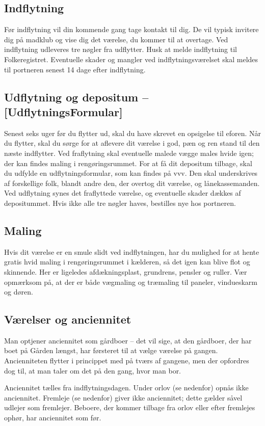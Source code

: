 \documentclass[11pt,article,twoside,openany,danish,extrafontsizes]{memoir} %
\begin{document}
\subsection{Indflytning}
Før indflytning vil din kommende gang tage kontakt til dig. De vil typisk invitere dig på madklub og vise dig det værelse, du kommer til at overtage. Ved indflytning udleveres tre nøgler fra udflytter. Husk at melde indflytning til Folkeregistret. Eventuelle skader og mangler ved indflytningsværelset skal meldes til portneren senest 14 dage efter indflytning.

\subsection{Udflytning og depositum -- [UdflytningsFormular]}
Senest seks uger før du flytter ud, skal du have skrevet en opsigelse til eforen. Når du flytter, skal du sørge for at aflevere dit værelse i god, pæn og ren stand til den næste indflytter. Ved fraflytning skal eventuelle malede vægge males hvide igen; der kan findes maling i rengøringsrummet. For at få dit depositum tilbage, skal du udfylde en udflytningsformular, som kan findes på vvv. Den skal underskrives af forskellige folk, blandt andre den, der overtog dit værelse, og lånekassemanden. Ved udflytning synes det fraflyttede værelse, og eventuelle skader dækkes af depositummet. Hvis ikke alle tre nøgler haves, bestilles nye hos portneren.


\subsection{Maling}
Hvis dit værelse er en smule slidt ved indflytningen, har du mulighed for at hente gratis hvid maling i rengøringsrummet i kælderen, så det igen kan blive flot og skinnende. Her er ligeledes afdækningsplast, grundrens, pensler og ruller. Vær opmærksom på, at der er både vægmaling og træmaling til paneler, vindueskarm og døren.

\subsection{Værelser og anciennitet}
Man optjener anciennitet som gårdboer -- det vil sige, at den gårdboer, der har boet på Gården længst, har førsteret til at vælge værelse på gangen. Ancienniteten flytter i princippet med på tværs af gangene, men der opfordres dog til, at man taler om det på den gang, hvor man bor.

Anciennitet tælles fra indflytningsdagen. Under orlov (se nedenfor) opnås ikke anciennitet. Fremleje (se nedenfor) giver ikke anciennitet; dette gælder såvel udlejer som fremlejer. Beboere, der kommer tilbage fra orlov eller efter fremlejes ophør, har anciennitet som før.
\end{document}
